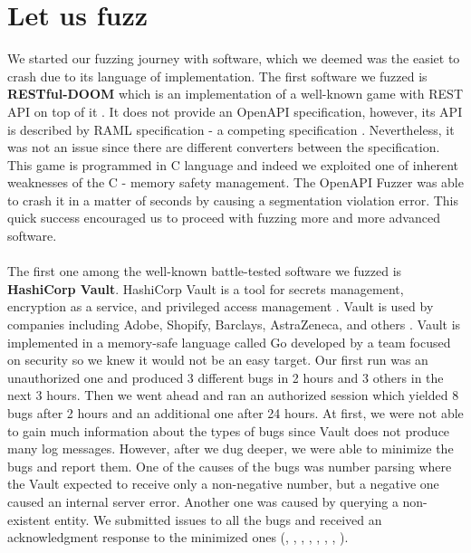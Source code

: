 \section{Let us fuzz}
We started our fuzzing journey with software, which we deemed was the easiet to crash due to its language of implementation. The first software we fuzzed is \textbf{RESTful-DOOM} which is an implementation of a well-known game with REST API on top of it \cite{doom2020github}. It does not provide an OpenAPI specification, however, its API is described by RAML specification - a competing specification \cite{raml2020web}. Nevertheless, it was not an issue since there are different converters between the specification. This game is programmed in C language and indeed we exploited one of inherent weaknesses of the C - memory safety management. The OpenAPI Fuzzer was able to crash it in a matter of seconds by causing a segmentation violation error. This quick success encouraged us to proceed with fuzzing more and more advanced software.

\paragraph{}
The first one among the well-known battle-tested software we fuzzed is \textbf{HashiCorp Vault}. HashiCorp Vault is a tool for secrets management, encryption as a service, and privileged access management \cite{vault2020github}. Vault is used by companies including Adobe, Shopify, Barclays, AstraZeneca, and others \cite{vault2021web}. Vault is implemented in a memory-safe language called Go developed by a team focused on security so we knew it would not be an easy target. Our first run was an unauthorized one and produced 3 different bugs in 2 hours and 3 others in the next 3 hours. Then we went ahead and ran an authorized session which yielded 8 bugs after 2 hours and an additional one after 24 hours. At first, we were not able to gain much information about the types of bugs since Vault does not produce many log messages. However, after we dug deeper, we were able to minimize the bugs and report them. One of the causes of the bugs was number parsing where the Vault expected to receive only a non-negative number, but a negative one caused an internal server error. Another one was caused by querying a non-existent entity. We submitted issues to all the bugs and received an acknowledgment response to the minimized ones (\cite{vaultissue11304github}, \cite{vaultissue11306github}, \cite{vaultissue11308github}, \cite{vaultissue11310github}, \cite{vaultissue11311github}, \cite{vaultissue11313github}, \cite{vaultissue11314github}, \cite{vaultissue11315github}).

